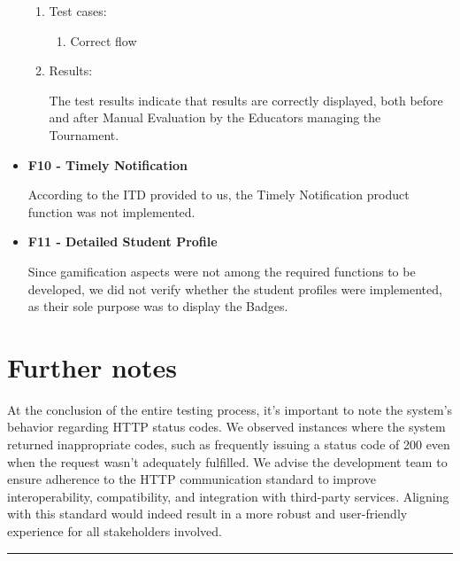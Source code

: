 \documentclass{Configuration_Files/Template}
\begin{document}
\begin{itemize}
\begin{enumerate}
        \item Test cases:
        
        \begin{enumerate}
        
            \item Correct flow
    
        \end{enumerate}
        
        \item Results:
        
        The test results indicate that results are correctly displayed, both before and after Manual Evaluation by the Educators managing the Tournament.\\
    
    \end{enumerate}

    
    \item \textbf{F10 - Timely Notification}
    
    According to the ITD provided to us, the Timely Notification product function was not implemented.\\

    \item \textbf{F11 - Detailed Student Profile}

    Since gamification aspects were not among the required functions to be developed, we did not verify whether the student profiles were implemented, as their sole purpose was to display the Badges.\\

\end{itemize}

\section{Further notes}

At the conclusion of the entire testing process, it's important to note the system's behavior regarding HTTP status codes. We observed instances where the system returned inappropriate codes, such as frequently issuing a status code of 200 even when the request wasn't adequately fulfilled. We advise the development team to ensure adherence to the HTTP communication standard to improve interoperability, compatibility, and integration with third-party services. Aligning with this standard would indeed result in a more robust and user-friendly experience for all stakeholders involved.

{\color{bluepoli}\rule{\linewidth}{0.1pt}}
\end{document}
